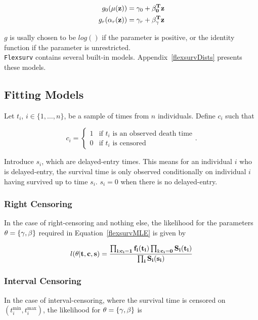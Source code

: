 \begin{align}
    \label{flexsurvMLE}
    g_0(\mu(\bf{z})) &= \gamma_0 + \bf{\beta}_0^Tz \nonumber \\
    g_r(\alpha_r(\bf{z})) &= \gamma_r + \bf{\beta}_{\gamma}^T\bf{z}
\end{align}

$g$ is usally chosen to be $log()$ if the parameter is positive, or the identity function if the parameter is unrestricted.\\

\verb|Flexsurv| contains several built-in models. Appendix~\ref{flexsurvDists} presents these models.

\subsection{Fitting Models}
Let $t_i$, $i \in \{1, \ldots, n\}$, be a sample of times from $n$ individuals. Define $c_i$ such that 

\[
    c_i = \begin{cases*}
        1 & \text{if $t_i$ is an observed death time} \\
        0 & \text{if $t_i$ is censored} 
    \end{cases*}  
.\]

Introduce $s_i$, which are delayed-entry times. This means for an individual $i$ who is delayed-entry, the survival time is only observed conditionally on individual $i$ having survived up to time $s_i$. $s_i = 0$ when there is no delayed-entry. \\

\subsubsection{Right Censoring}
In the case of right-censoring and nothing else, the likelihood for the parameters $\bf{\theta} = \{\bf{\gamma}, \bf{\beta}\}$ required in Equation~\ref{flexsurvMLE} is given by 

\begin{equation}
    \label{flexsurvRightCens}
    l(\bf{\theta}|\bf{t},\bf{c},\bf{s}) = \frac{\prod_{i:c_i=1} f_i(t_i) \prod_{i:c_i=0} S_i(t_i)}{\prod_{i} S_i(s_i)}
\end{equation}

\subsubsection{Interval Censoring}
In the case of interval-censoring, where the survival time is censored on $(t_i^{\text{min}}, t_i^{\text{max}})$, the likelihood for $\bf{\theta} = \{\bf{\gamma}, \bf{\beta}\}$ is 

